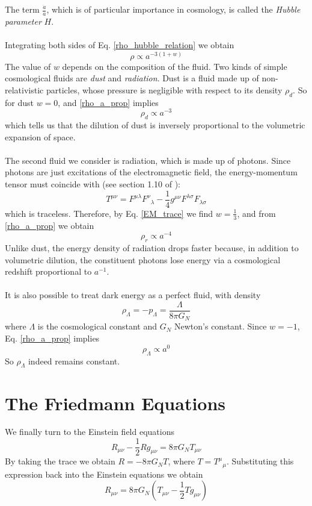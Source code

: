 \documentclass[12pt,letterpaper]{article}         %
\newcommand\para{\paragraph{}}
\begin{document}
The term $\frac{\dot{a}}{a}$, which is of particular importance in cosmology, is called the \emph{Hubble parameter} $H$.
\para
Integrating both sides of Eq. \eqref{rho_hubble_relation} we obtain
\begin{equation}
    \rho \propto a^{-3(1+w)}
    \label{rho_a_prop}
\end{equation}
The value of $w$ depends on the composition of the fluid. Two kinds of simple cosmological fluids are \emph{dust} and \emph{radiation}. Dust is a fluid made up of non-relativistic particles, whose pressure is negligible with respect to its density $\rho_d$. So for dust $w = 0$, and \eqref{rho_a_prop} implies
\[
\rho_d \propto a^{-3}
\]
which tells us that the dilution of dust is inversely proportional to the volumetric expansion of space.
\para
The second fluid we consider is radiation, which is made up of photons. Since photons are just excitations of the electromagnetic field, the energy-momentum tensor must coincide with (see section 1.10 of \cite{carroll-spacetime}):
\[
    T^{\mu \nu} = F^{\mu \lambda} F^{\nu}{}_{\lambda} - \frac{1}{4} g^{\mu \nu} F^{\lambda \sigma}F_{\lambda \sigma}
\]
which is traceless. Therefore, by Eq. \eqref{EM_trace} we find $w = \frac{1}{3}$, and from \eqref{rho_a_prop} we obtain \[
    \rho_r \propto a^{-4}
\]
Unlike dust, the energy density of radiation drops faster because, in addition to volumetric dilution, the constituent photons lose energy via a cosmological redshift proportional to $a^{-1}$.
\para
It is also possible to treat dark energy as a perfect fluid, with density \[\rho_{\Lambda} = -p_{\Lambda} =  \frac{\Lambda}{8 \pi G_N}\] where $\Lambda$ is the cosmological constant and $G_N$ Newton's constant. Since $w = -1$, Eq. \eqref{rho_a_prop} implies
\[
\rho_\Lambda \propto a^{0}
\]
So $\rho_\Lambda$ indeed remains constant.

\section{The Friedmann Equations}
We finally turn to the Einstein field equations \[
    R_{\mu \nu}  - \frac{1}{2} R g_{\mu \nu} = 8 \pi G_N T_{\mu \nu}
\]
By taking the trace we obtain $R = - 8 \pi G_N T$, where $T = T^\mu{}_\mu$. Substituting this expression back into the Einstein equations we obtain \begin{equation}  
R_{\mu \nu} = 8 \pi G_N (T_{\mu\nu} - \frac{1}{2}T g_{\mu\nu})
\label{EE}
\end{equation}
\end{document}
